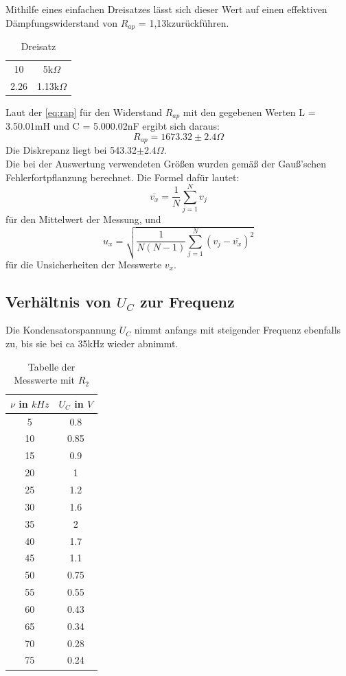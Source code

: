 Mithilfe eines einfachen Dreisatzes lässt sich dieser Wert auf einen effektiven Dämpfungswiderstand von \(R_{ap}\) = 1,13k\Omega zurückführen.
\newpage
\begin{table}
  \centering
  \caption{Dreisatz}
  \label{tab:drei}
  \begin{tabular}{c c}
    \midrule
    10 & 5k\(\Omega\)\\
    2.26 & 1.13k\(\Omega\)\\
    \bottomrule
  \end{tabular}
\end{table}
Laut der \autoref{eq:rap} für den Widerstand \(R_{ap}\) mit den gegebenen Werten L = 3.5\pm0.01mH und C = 5.00\pm0.02nF ergibt sich daraus:
\begin{equation}
  R_{ap} = 1673.32\pm2.4\Omega
\end{equation}
Die Diskrepanz liegt bei 543.32\(\pm\)2.4\(\Omega\).\\
Die bei der Auswertung verwendeten Größen wurden gemäß der Gauß'schen Fehlerfortpflanzung berechnet.
Die Formel dafür lautet:
\begin{equation}
    \overline{v_x}=\frac{1}{N} \sum_{j=1}^N v_j
\end{equation}
für den Mittelwert der Messung, und
\begin{equation}
    u_x = \sqrt{\frac{1}{N(N-1)} \sum_{j=1}^N (v_j-\overline{v_x})^2}
\end{equation}
für die Unsicherheiten der Messwerte $v_x$.

\newpage
\subsection{Verhältnis von \(U_C\) zur Frequenz}
Die Kondensatorspannung \(U_C\) nimmt anfangs mit steigender Frequenz ebenfalls zu, bis sie bei ca 35kHz wieder abnimmt.
\begin{table}
  \centering
  \caption{Tabelle der Messwerte mit \(R_2\)}
  \label{tab:tab2}
  \begin{tabular}{c c}
    \toprule
    $\nu$ in $kHz$ & \(U_C\) in $V$\\
    \midrule
    5 & 0.8\\
    10 & 0.85\\
    15 & 0.9\\
    20 & 1\\
    25 & 1.2\\
    30 & 1.6\\
    35 & 2\\
    40 & 1.7\\
    45 & 1.1\\
    50 & 0.75\\
    55 & 0.55\\
    60 & 0.43\\
    65 & 0.34\\
    70 & 0.28\\
    75 & 0.24\\
    \bottomrule
  \end{tabular}
\end{table}

